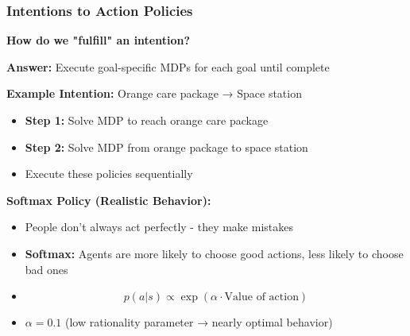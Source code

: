 \documentclass{beamer}
\begin{document}
\begin{frame}
\frametitle{Intentions to Action Policies}
\textbf{How do we "fulfill" an intention?}

\vspace{0.3cm}
\textbf{Answer:} Execute goal-specific MDPs for each goal until complete

\vspace{0.3cm}
\textbf{Example Intention:} Orange care package → Space station
\begin{itemize}
    \item \textbf{Step 1:} Solve MDP to reach orange care package
    \item \textbf{Step 2:} Solve MDP from orange package to space station
    \item Execute these policies sequentially
\end{itemize}

\vspace{0.3cm}
\textbf{Softmax Policy (Realistic Behavior):}
\begin{itemize}
    \item People don't always act perfectly - they make mistakes
    \item \textbf{Softmax:} Agents are more likely to choose good actions, less likely to choose bad ones
    \item $$p(a|s) \propto \exp(\alpha \cdot \text{Value of action})$$
    \item $\alpha = 0.1$ (low rationality parameter → nearly optimal behavior)
\end{itemize}
\end{frame}
\end{document}

